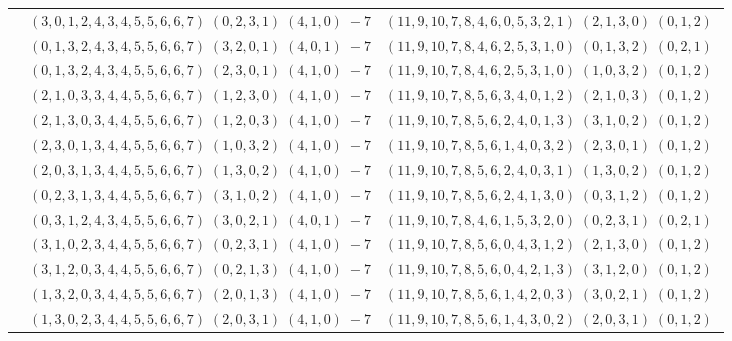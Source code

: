 \documentclass[11pt]{article}
\begin{document}
\begin{longtable}[l]{|c|c|c|}
 \cline{2-3} 
 & $(3 ,0 ,1 ,2 ,4 ,3 ,4 ,5 ,5 ,6 ,6 ,7) \;(0 ,2 ,3 ,1) \;(4 ,1 ,0) \;-7$ & $(11 ,9 ,10 ,7 ,8 ,4 ,6 ,0 ,5 ,3 ,2 ,1) \;(2 ,1 ,3 ,0) \;(0 ,1 ,2) \;$\\ 
 \cline{2-3} 
 & $(0 ,1 ,3 ,2 ,4 ,3 ,4 ,5 ,5 ,6 ,6 ,7) \;(3 ,2 ,0 ,1) \;(4 ,0 ,1) \;-7$ & $(11 ,9 ,10 ,7 ,8 ,4 ,6 ,2 ,5 ,3 ,1 ,0) \;(0 ,1 ,3 ,2) \;(0 ,2 ,1) \;$\\ 
 \cline{2-3} 
 & $(0 ,1 ,3 ,2 ,4 ,3 ,4 ,5 ,5 ,6 ,6 ,7) \;(2 ,3 ,0 ,1) \;(4 ,1 ,0) \;-7$ & $(11 ,9 ,10 ,7 ,8 ,4 ,6 ,2 ,5 ,3 ,1 ,0) \;(1 ,0 ,3 ,2) \;(0 ,1 ,2) \;$\\ 
 \cline{2-3} 
 & $(2 ,1 ,0 ,3 ,3 ,4 ,4 ,5 ,5 ,6 ,6 ,7) \;(1 ,2 ,3 ,0) \;(4 ,1 ,0) \;-7$ & $(11 ,9 ,10 ,7 ,8 ,5 ,6 ,3 ,4 ,0 ,1 ,2) \;(2 ,1 ,0 ,3) \;(0 ,1 ,2) \;$\\ 
 \cline{2-3} 
 & $(2 ,1 ,3 ,0 ,3 ,4 ,4 ,5 ,5 ,6 ,6 ,7) \;(1 ,2 ,0 ,3) \;(4 ,1 ,0) \;-7$ & $(11 ,9 ,10 ,7 ,8 ,5 ,6 ,2 ,4 ,0 ,1 ,3) \;(3 ,1 ,0 ,2) \;(0 ,1 ,2) \;$\\ 
 \cline{2-3} 
 & $(2 ,3 ,0 ,1 ,3 ,4 ,4 ,5 ,5 ,6 ,6 ,7) \;(1 ,0 ,3 ,2) \;(4 ,1 ,0) \;-7$ & $(11 ,9 ,10 ,7 ,8 ,5 ,6 ,1 ,4 ,0 ,3 ,2) \;(2 ,3 ,0 ,1) \;(0 ,1 ,2) \;$\\ 
 \cline{2-3} 
 & $(2 ,0 ,3 ,1 ,3 ,4 ,4 ,5 ,5 ,6 ,6 ,7) \;(1 ,3 ,0 ,2) \;(4 ,1 ,0) \;-7$ & $(11 ,9 ,10 ,7 ,8 ,5 ,6 ,2 ,4 ,0 ,3 ,1) \;(1 ,3 ,0 ,2) \;(0 ,1 ,2) \;$\\ 
 \cline{2-3} 
 & $(0 ,2 ,3 ,1 ,3 ,4 ,4 ,5 ,5 ,6 ,6 ,7) \;(3 ,1 ,0 ,2) \;(4 ,1 ,0) \;-7$ & $(11 ,9 ,10 ,7 ,8 ,5 ,6 ,2 ,4 ,1 ,3 ,0) \;(0 ,3 ,1 ,2) \;(0 ,1 ,2) \;$\\ 
 \cline{2-3} 
 & $(0 ,3 ,1 ,2 ,4 ,3 ,4 ,5 ,5 ,6 ,6 ,7) \;(3 ,0 ,2 ,1) \;(4 ,0 ,1) \;-7$ & $(11 ,9 ,10 ,7 ,8 ,4 ,6 ,1 ,5 ,3 ,2 ,0) \;(0 ,2 ,3 ,1) \;(0 ,2 ,1) \;$\\ 
 \cline{2-3} 
 & $(3 ,1 ,0 ,2 ,3 ,4 ,4 ,5 ,5 ,6 ,6 ,7) \;(0 ,2 ,3 ,1) \;(4 ,1 ,0) \;-7$ & $(11 ,9 ,10 ,7 ,8 ,5 ,6 ,0 ,4 ,3 ,1 ,2) \;(2 ,1 ,3 ,0) \;(0 ,1 ,2) \;$\\ 
 \cline{2-3} 
 & $(3 ,1 ,2 ,0 ,3 ,4 ,4 ,5 ,5 ,6 ,6 ,7) \;(0 ,2 ,1 ,3) \;(4 ,1 ,0) \;-7$ & $(11 ,9 ,10 ,7 ,8 ,5 ,6 ,0 ,4 ,2 ,1 ,3) \;(3 ,1 ,2 ,0) \;(0 ,1 ,2) \;$\\ 
 \cline{2-3} 
 & $(1 ,3 ,2 ,0 ,3 ,4 ,4 ,5 ,5 ,6 ,6 ,7) \;(2 ,0 ,1 ,3) \;(4 ,1 ,0) \;-7$ & $(11 ,9 ,10 ,7 ,8 ,5 ,6 ,1 ,4 ,2 ,0 ,3) \;(3 ,0 ,2 ,1) \;(0 ,1 ,2) \;$\\ 
 \cline{2-3} 
 & $(1 ,3 ,0 ,2 ,3 ,4 ,4 ,5 ,5 ,6 ,6 ,7) \;(2 ,0 ,3 ,1) \;(4 ,1 ,0) \;-7$ & $(11 ,9 ,10 ,7 ,8 ,5 ,6 ,1 ,4 ,3 ,0 ,2) \;(2 ,0 ,3 ,1) \;(0 ,1 ,2) \;$\\ 

\end{longtable}
\end{document}
